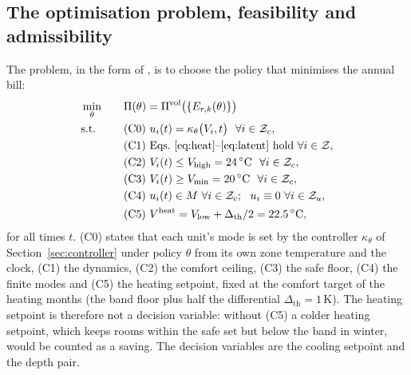 \documentclass[10pt,a4paper,twocolumn]{article}
\theoremstyle{definition}
\begin{document}
\subsection{The optimisation problem, feasibility and admissibility}\label{sec:optproblem}\label{sec:problem}
The problem, in the form of \citet{mousa2017optimal}, is to choose the policy that minimises the annual bill:
\begin{alignat}{2}
&\min_{\theta}&\quad&\Pi(\theta)=\Pi^{\text{vol}}\bigl(\{E_{r,k}(\theta)\}\bigr)\label{eq:obj}\\
&\text{s.t.}&&\text{(C0) }u_i(t)=\kappa_\theta\bigl(V_i,t\bigr)\ \ \forall i\in\mathcal{Z}_c,\nonumber\\
&&&\text{(C1) Eqs.~\eqref{eq:heat}--\eqref{eq:latent} hold }\forall i\in\mathcal{Z},\nonumber\\
&&&\text{(C2) }V_i(t)\le V_{\text{high}}=24\,^{\circ}\text{C}\ \ \forall i\in\mathcal{Z}_c,\nonumber\\
&&&\text{(C3) }V_i(t)\ge V_{\min}=20\,^{\circ}\text{C}\ \ \forall i\in\mathcal{Z}_c,\nonumber\\
&&&\text{(C4) }u_i(t)\in M\ \forall i\in\mathcal{Z}_c;\ \ u_i\equiv0\ \forall i\in\mathcal{Z}_u,\nonumber\\
&&&\text{(C5) }V^{\text{heat}}=V_{\text{low}}+\Delta_{\text{th}}/2=22.5\,^{\circ}\text{C},\nonumber
\end{alignat}
for all times $t$. (C0) states that each unit's mode is set by the controller $\kappa_\theta$ of Section~\ref{sec:controller} under policy $\theta$ from its own zone temperature and the clock, (C1) the dynamics, (C2) the comfort ceiling, (C3) the safe floor, (C4) the finite modes and (C5) the heating setpoint, fixed at the comfort target of the heating months (the band floor plus half the differential $\Delta_{\text{th}}=1\,$K). The heating setpoint is therefore not a decision variable: without (C5) a colder heating setpoint, which keeps rooms within the safe set but below the band in winter, would be counted as a saving. The decision variables are the cooling setpoint and the depth pair.
\end{document}
